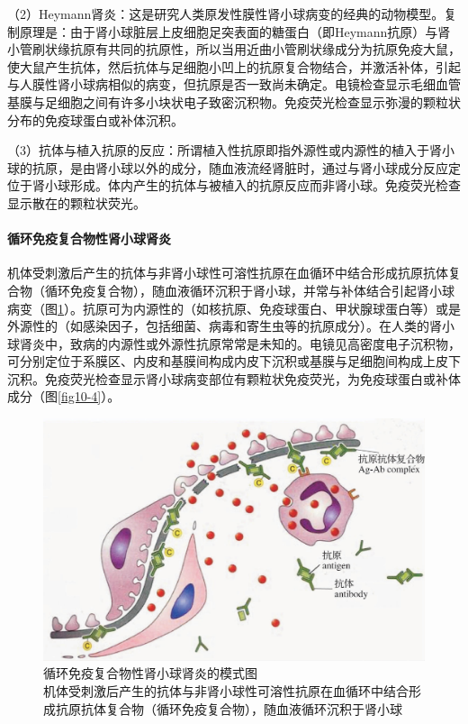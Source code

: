 （2）Heymann肾炎：这是研究人类原发性膜性肾小球病变的经典的动物模型。复制原理是：由于肾小球脏层上皮细胞足突表面的糖蛋白（即Heymann抗原）与肾小管刷状缘抗原有共同的抗原性，所以当用近曲小管刷状缘成分为抗原免疫大鼠，使大鼠产生抗体，然后抗体与足细胞小凹上的抗原复合物结合，并激活补体，引起与人膜性肾小球病相似的病变，但抗原是否一致尚未确定。电镜检查显示毛细血管基膜与足细胞之间有许多小块状电子致密沉积物。免疫荧光检查显示弥漫的颗粒状分布的免疫球蛋白或补体沉积。

（3）抗体与植入抗原的反应：所谓植入性抗原即指外源性或内源性的植入于肾小球的抗原，是由肾小球以外的成分，随血液流经肾脏时，通过与肾小球成分反应定位于肾小球形成。体内产生的抗体与被植入的抗原反应而非肾小球。免疫荧光检查显示散在的颗粒状荧光。

\paragraph{循环免疫复合物性肾小球肾炎}
机体受刺激后产生的抗体与非肾小球性可溶性抗原在血循环中结合形成抗原抗体复合物（循环免疫复合物），随血液循环沉积于肾小球，并常与补体结合引起肾小球病变（图\ref{fig10-3}）。抗原可为内源性的（如核抗原、免疫球蛋白、甲状腺球蛋白等）或是外源性的（如感染因子，包括细菌、病毒和寄生虫等的抗原成分）。在人类的肾小球肾炎中，致病的内源性或外源性抗原常常是未知的。电镜见高密度电子沉积物，可分别定位于系膜区、内皮和基膜间构成内皮下沉积或基膜与足细胞间构成上皮下沉积。免疫荧光检查显示肾小球病变部位有颗粒状免疫荧光，为免疫球蛋白或补体成分（图\ref{fig10-4}）。

\begin{figure}[!htbp]
 \centering
 \includegraphics{./images/Image00149.jpg}
 \captionsetup{justification=centering}
 \caption{循环免疫复合物性肾小球肾炎的模式图\\ {\small 机体受刺激后产生的抗体与非肾小球性可溶性抗原在血循环中结合形成抗原抗体复合物（循环免疫复合物），随血液循环沉积于肾小球}}
\label{fig10-3}
  \end{figure}


